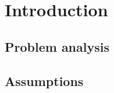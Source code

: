 \chapter{Introduction}
\label{Introduction}

\section{Problem analysis}
\label{Introduction_analysis}

\section{Assumptions}
\label{Introduction_assumptions}